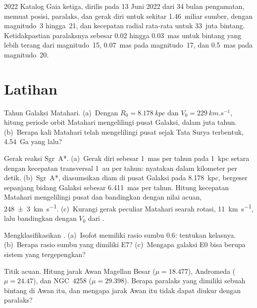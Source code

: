 \begin{dated}{2022}
Katalog Gaia ketiga, dirilis pada 13 Juni 2022 dari 34 bulan
pengamatan, memuat posisi, paralaks, dan gerak diri untuk sekitar
1.46~miliar sumber, dengan magnitudo~3 hingga~21, dan kecepatan radial rata-rata
untuk 33~juta bintang. Ketidakpastian paralaksnya sebesar 0.02 hingga
\qty{0.03}{mas} untuk bintang yang lebih terang dari magnitudo~15, \qty{0.07}{mas} pada
magnitudo~17, dan \qty{0.5}{mas} pada magnitudo~20.
\end{dated}

\section{Latihan}

\begin{exercise}[$\star$]\label{exo:b3:milky-way-galaxies:1}
Tahun Galaksi Matahari. (a)~Dengan $R_0 = \qty{8.178}{kpc}$ dan
$V_0 = \qty{229}{km.s^{-1}}$, hitung periode orbit Matahari mengelilingi
pusat Galaksi, dalam juta tahun. (b)~Berapa kali Matahari
telah mengelilingi pusat sejak Tata Surya terbentuk, \qty{4.54}{Ga} yang lalu?
\end{exercise}

\begin{exercise}[$\star$]\label{exo:b3:milky-way-galaxies:2}
Gerak reaksi Sgr~A*. (a)~Gerak diri sebesar \qty{1}{mas} per tahun
pada \qty{1}{kpc} setara dengan kecepatan transversal \qty{1}{au} per tahun: nyatakan dalam
kilometer per detik. (b)~Sgr~A*, diasumsikan diam di pusat Galaksi
pada \qty{8.178}{kpc}, bergeser sepanjang bidang Galaksi sebesar \qty{6.411}{mas}
per tahun. Hitung kecepatan Matahari mengelilingi pusat dan bandingkan dengan
nilai acuan, \qty[separate-uncertainty=true]{248 \pm 3}{km.s^{-1}}. (c)~Kurangi gerak
peculiar Matahari searah rotasi, \qty{11}{km.s^{-1}}, lalu
bandingkan dengan $V_0$ dari .
\end{exercise}

\begin{exercise}[$\star$]\label{exo:b3:milky-way-galaxies:3}
Mengklasifikasikan . (a)~Isofot  memiliki
rasio sumbu 0.6: tentukan kelasnya. (b)~Berapa rasio sumbu yang dimiliki E7?
(c)~Mengapa galaksi E0 bisa berupa sistem yang tergepengkan?
\end{exercise}

\begin{exercise}[$\star$]\label{exo:b3:milky-way-galaxies:4}
Titik acuan. Hitung jarak Awan Magellan Besar
($\mu = 18.477$), Andromeda ($\mu = 24.47$), dan NGC~4258
($\mu = 29.398$). Berapa paralaks yang dimiliki sebuah bintang di Awan itu, dan mengapa
jarak Awan itu tidak dapat diukur dengan paralaks?
\end{exercise}


